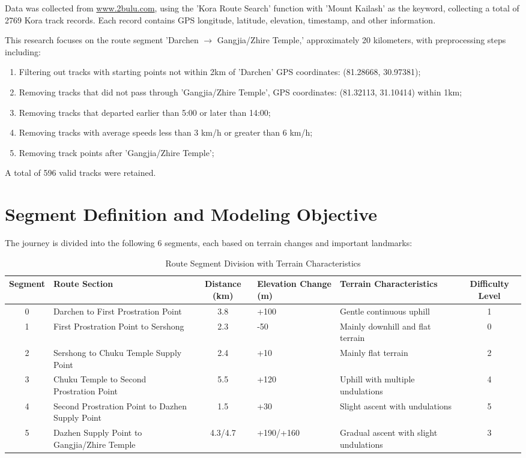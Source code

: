 \documentclass[12pt]{article}
\begin{document}
Data was collected from \href{https://www.2bulu.com}{www.2bulu.com}, using the 'Kora Route Search' function with 'Mount Kailash' as the keyword, collecting a total of 2769 Kora track records. Each record contains GPS longitude, latitude, elevation, timestamp, and other information.

This research focuses on the route segment 'Darchen $\rightarrow$ Gangjia/Zhire Temple,' approximately 20 kilometers, with preprocessing steps including:

\begin{enumerate}
  \item Filtering out tracks with starting points not within 2km of 'Darchen' GPS coordinates: (81.28668, 30.97381);
  \item Removing tracks that did not pass through 'Gangjia/Zhire Temple', GPS coordinates: (81.32113, 31.10414) within 1km;
  \item Removing tracks that departed earlier than 5:00 or later than 14:00;
  \item Removing tracks with average speeds less than 3 km/h or greater than 6 km/h;
  \item Removing track points after 'Gangjia/Zhire Temple';
\end{enumerate}

A total of 596 valid tracks were retained.


\section{Segment Definition and Modeling Objective}

The journey is divided into the following 6 segments, each based on terrain changes and important landmarks:

\begin{table}[H]
\centering
\caption{Route Segment Division with Terrain Characteristics}
\begin{tabular}{cp{3.2cm}cp{1.8cm}p{3.5cm}c}
\toprule
Segment & Route Section & Distance (km) & Elevation Change (m) & Terrain Characteristics & Difficulty Level \\
\midrule
0 & Darchen to First Prostration Point & 3.8 & +100 & Gentle continuous uphill & 1 \\
1 & First Prostration Point to Sershong & 2.3 & -50 & Mainly downhill and flat terrain & 0 \\
2 & Sershong to Chuku Temple Supply Point & 2.4 & +10 & Mainly flat terrain & 2 \\
3 & Chuku Temple to Second Prostration Point & 5.5 & +120 & Uphill with multiple undulations & 4 \\
4 & Second Prostration Point to Dazhen Supply Point & 1.5 & +30 & Slight ascent with undulations & 5 \\
5 & Dazhen Supply Point to Gangjia/Zhire Temple & 4.3/4.7 & +190/+160 & Gradual ascent with slight undulations & 3 \\
\bottomrule
\end{tabular}
\end{table}
\end{document}
